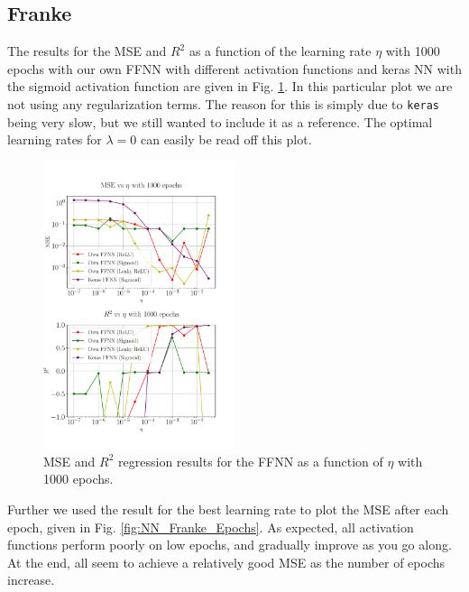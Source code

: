 \documentclass[%
reprint,s
amsmath,amssymb,
aps,
]{revtex4-2}
\begin{document}
\subsection{Franke}
The results for the MSE and $R^2$ as a function of the learning rate $\eta$ with 1000 epochs with our own FFNN with different activation functions and keras NN with the sigmoid activation function are given in Fig. \ref{fig:NN_Franke_LR_1000}. In this particular plot we are not using any regularization terms. The reason for this is simply due to \texttt{keras} being very slow, but we still wanted to include it as a reference. The optimal learning rates for $\lambda=0$ can easily be read off this plot.
\begin{figure}[ht!]
	\includegraphics[width=0.5\textwidth]{Python/Figures/NN_MSE_R2_Franke_LearningRate_Epochs1000.pdf}
	\caption{MSE and $R^2$ regression results for the FFNN as a function of $\eta$ with 1000 epochs.}
	\label{fig:NN_Franke_LR_1000}
\end{figure}

Further we used the result for the best learning rate to plot the MSE after each epoch, given in Fig. \ref{fig:NN_Franke_Epochs}. As expected, all activation functions perform poorly on low epochs, and gradually improve as you go along. At the end, all seem to achieve a relatively good MSE as the number of epochs increase.
\end{document}
